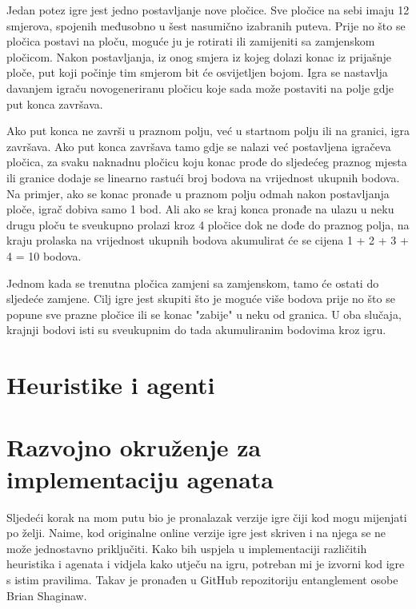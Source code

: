 \documentclass[zavrsnirad]{fer}
\begin{document}
Jedan potez igre jest jedno postavljanje nove pločice. Sve pločice na sebi imaju 12 smjerova, spojenih međusobno u šest nasumično izabranih puteva. Prije no što se pločica postavi na ploču, moguće ju je rotirati ili zamijeniti sa zamjenskom pločicom. Nakon postavljanja, iz onog smjera iz kojeg dolazi konac iz prijašnje ploče, put koji počinje tim smjerom bit će osvijetljen bojom. Igra se nastavlja davanjem igraču novogeneriranu pločicu koje sada može postaviti na polje gdje put konca završava.

Ako put konca ne završi u praznom polju, već u startnom polju ili na granici, igra završava. Ako put konca završava tamo gdje se nalazi već postavljena igračeva pločica, za svaku naknadnu pločicu koju konac prođe do sljedećeg praznog mjesta ili granice dodaje se linearno rastući broj bodova na vrijednost ukupnih bodova. Na primjer, ako se konac pronađe u praznom polju odmah nakon postavljanja ploče, igrač dobiva samo 1 bod. Ali ako se kraj konca pronađe na ulazu u neku drugu ploču te sveukupno prolazi kroz 4 pločice dok ne dođe do praznog polja, na kraju prolaska na vrijednost ukupnih bodova akumulirat će se cijena 1 + 2 + 3 + 4 = 10 bodova.

Jednom kada se trenutna pločica zamjeni sa zamjenskom, tamo će ostati do sljedeće zamjene. Cilj igre jest skupiti što je moguće više bodova prije no što se popune sve prazne pločice ili se konac "zabije" u neku od granica. U oba slučaja, krajnji bodovi isti su sveukupnim do tada akumuliranim bodovima kroz igru.

\section{Heuristike i agenti}
\label{pog:opis_agenata}



\section{Razvojno okruženje za implementaciju agenata}
\label{pog:razvojno_okruzenje}


Sljedeći korak na mom putu bio je pronalazak verzije igre čiji kod mogu mijenjati po želji. Naime, kod originalne online verzije igre jest skriven i na njega se ne može jednostavno priključiti. Kako bih uspjela u implementaciji različitih heuristika i agenata i vidjela kako utječu na igru, potreban mi je izvorni kod igre s istim pravilima. Takav je pronađen u GitHub repozitoriju \cite{entanglementgithub} entanglement osobe Brian Shaginaw.
\end{document}
